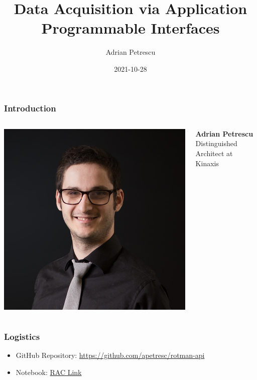 \documentclass[dvipsnames]{beamer}
\title[Data Acquisition via APIs]{Data Acquisition via Application Programmable Interfaces}
\author{Adrian Petrescu}
\institute{Kinaxis}
\date{2021-10-28}
\begin{document}
\frame{\titlepage}


\begin{frame}
  \frametitle{Introduction}

  \begin{columns}

    \includegraphics{img/speaker-headshot.png}

    \textbf{Adrian Petrescu} \\
    Distinguished Architect at Kinaxis
  \end{columns}
\end{frame}

\begin{frame}
  \frametitle{Logistics}
  
  \begin{itemize}
    \item GitHub Repository: \href{https://github.com/apetresc/rotman-api}{https://github.com/apetresc/rotman-api}
    \item Notebook: \href{https://rac.rotman.utoronto.ca/jupyter/user/ut_apetrescu/lab/tree/Day1.ipynb}{RAC Link}
  \end{itemize}
\end{frame}
\end{document}
